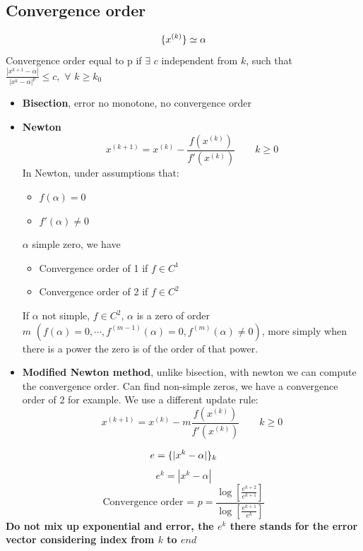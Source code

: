 \subsection{Convergence order}

$$
\{{x^{(k)}}\}\simeq\alpha
$$
Convergence order equal to p if $\exists\,\,c$ independent from $k$, such that $\frac{|x^{k+1}-\alpha|}{|x^k-\alpha|^p}\leq c,\,\,\forall\,\,k\geq k_0$
\begin{itemize}
    \item \textbf{Bisection}, error no monotone, no convergence order
    \item \textbf{Newton}
    $$x^{(k+1)}=x^{(k)}-\frac{f(x^{(k)})}{f'(x^{(k)})}\qquad k\geq 0$$
    In Newton, under assumptions that:
    \begin{itemize}
        \item $f(\alpha)=0$
        \item $f'(\alpha)\neq 0$
    \end{itemize}
    $\alpha$ simple zero, we have
    \begin{itemize}
        \item Convergence order of 1 if $f\in C^1$
        \item Convergence order of 2 if $f\in C^2$
    \end{itemize}
    If $\alpha$ not simple, $f\in C^2$, $\alpha$ is a zero of order $m\,\,(f(\alpha)=0,\cdots,f^{(m-1)}(\alpha)=0,f^{(m)}(\alpha)\neq 0)$, more simply when there is a power the zero is of the order of that power.
    \item \textbf{Modified Newton method}, unlike bisection, with newton we can compute the convergence order. Can find non-simple zeros, we have a convergence order of 2 for example. We use a different update rule:
    $$x^{(k+1)}=x^{(k)}-m\frac{f(x^{(k)})}{f'(x^{(k)})}\qquad k\geq 0$$
\end{itemize}
$$e=\{{|x^k-\alpha|}\}_k$$
$$e^k=|x^k-\alpha|$$
$$\text{Convergence order = }p=\frac{
\log\left[
    \frac{e^{k+2}}{e^{k+1}}
\right]
}{
\log\left[
    \frac{e^{k+1}}{e^{k}}
\right]
}$$
\textbf{Do not mix up exponential and error, the $e^{k}$ there stands for the error vector considering index from $k$ to $end$}

